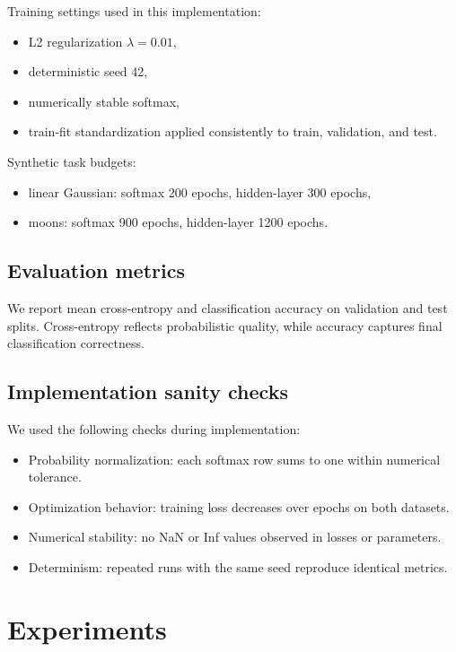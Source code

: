 \documentclass[sigconf,screen,nonacm]{acmart}
\begin{document}
Training settings used in this implementation:
\begin{itemize}[leftmargin=*]
    \item L2 regularization $\lambda=0.01$,
    \item deterministic seed 42,
    \item numerically stable softmax,
    \item train-fit standardization applied consistently to train, validation, and test.
\end{itemize}

Synthetic task budgets:
\begin{itemize}[leftmargin=*]
    \item linear Gaussian: softmax 200 epochs, hidden-layer 300 epochs,
    \item moons: softmax 900 epochs, hidden-layer 1200 epochs.
\end{itemize}

\subsection{Evaluation metrics}
We report mean cross-entropy and classification accuracy on validation and test splits. Cross-entropy reflects probabilistic quality, while accuracy captures final classification correctness.

\subsection{Implementation sanity checks}
We used the following checks during implementation:
\begin{itemize}[leftmargin=*]
    \item Probability normalization: each softmax row sums to one within numerical tolerance.
    \item Optimization behavior: training loss decreases over epochs on both datasets.
    \item Numerical stability: no NaN or Inf values observed in losses or parameters.
    \item Determinism: repeated runs with the same seed reproduce identical metrics.
\end{itemize}

\section{Experiments}
\end{document}
